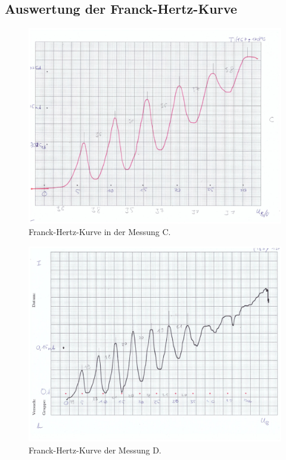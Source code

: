 \subsection{Auswertung der Franck-Hertz-Kurve}
\begin{figure}
    \centering
    \includegraphics[height=0.4\textheight]{Abbildungen/Messung_C.pdf}
    \caption{Franck-Hertz-Kurve in der Messung C.}
    \label{fig:messung_c}
\end{figure}
\begin{figure}
    \centering
    \includegraphics[height=0.4\textheight]{Abbildungen/Messung_D.pdf}
    \caption{Franck-Hertz-Kurve der Messung D.}
    \label{fig:messung_d}
\end{figure}

